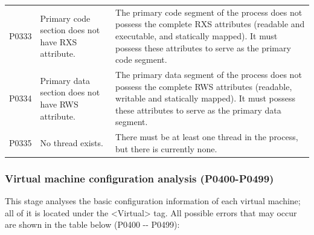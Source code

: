 \begin{xltabular}{\textwidth}{@{}>{\hsize\raggedright\arraybackslash}X>{\hsize\raggedright\arraybackslash}X>{\hsize\raggedright\arraybackslash}X@{}}
P0333 & Primary code section does not have RXS attribute. &
The primary code segment of the process does not possess the complete RXS attributes (readable and executable, and statically mapped). It must possess these attributes to serve as the primary code segment.\tabularnewline
P0334 & Primary data section does not have RWS attribute. &
The primary data segment of the process does not possess the complete RWS attributes (readable, writable and statically mapped). It must possess these attributes to serve as the primary data segment.\tabularnewline
P0335 & No thread exists. &
There must be at least one thread in the process, but there is currently none.\tabularnewline
\end{xltabular}

\subsubsection{Virtual machine configuration analysis (P0400-P0499)}\label{subsubsec:5-6-2-5}

This stage analyses the basic configuration information of each virtual machine; all of it is located under the <Virtual> tag. All possible errors that may occur are shown in the table below (P0400
-\/- P0499):

